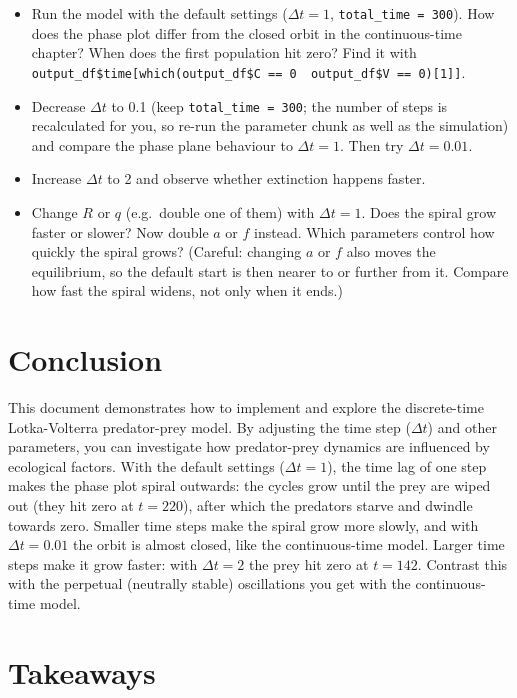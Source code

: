 \documentclass[
  a4paper]{book}
\providecommand{\tightlist}{%
  \setlength{\itemsep}{0pt}\setlength{\parskip}{0pt}}
\begin{document}
\begin{itemize}
\tightlist
\item
  Run the model with the default settings (\(\Delta t = 1\), \texttt{total\_time\ =\ 300}). How does the phase plot differ from the closed orbit in the continuous-time chapter? When does the first population hit zero? Find it with \texttt{output\_df\$time{[}which(output\_df\$C\ ==\ 0\ \textbar{}\ output\_df\$V\ ==\ 0){[}1{]}{]}}.
\item
  Decrease \(\Delta t\) to 0.1 (keep \texttt{total\_time\ =\ 300}; the number of steps is recalculated for you, so re-run the parameter chunk as well as the simulation) and compare the phase plane behaviour to \(\Delta t = 1\). Then try \(\Delta t = 0.01\).
\item
  Increase \(\Delta t\) to 2 and observe whether extinction happens faster.
\item
  Change \(R\) or \(q\) (e.g.~double one of them) with \(\Delta t = 1\). Does the spiral grow faster or slower? Now double \(a\) or \(f\) instead. Which parameters control how quickly the spiral grows? (Careful: changing \(a\) or \(f\) also moves the equilibrium, so the default start is then nearer to or further from it. Compare how fast the spiral widens, not only when it ends.)
\end{itemize}

\section{Conclusion}\label{conclusion-1}

This document demonstrates how to implement and explore the discrete-time Lotka-Volterra predator-prey model. By adjusting the time step (\(\Delta t\)) and other parameters, you can investigate how predator-prey dynamics are influenced by ecological factors. With the default settings (\(\Delta t = 1\)), the time lag of one step makes the phase plot spiral outwards: the cycles grow until the prey are wiped out (they hit zero at \(t = 220\)), after which the predators starve and dwindle towards zero. Smaller time steps make the spiral grow more slowly, and with \(\Delta t = 0.01\) the orbit is almost closed, like the continuous-time model. Larger time steps make it grow faster: with \(\Delta t = 2\) the prey hit zero at \(t = 142\). Contrast this with the perpetual (neutrally stable) oscillations you get with the continuous-time model.

\section{Takeaways}\label{takeaways-22}
\end{document}
